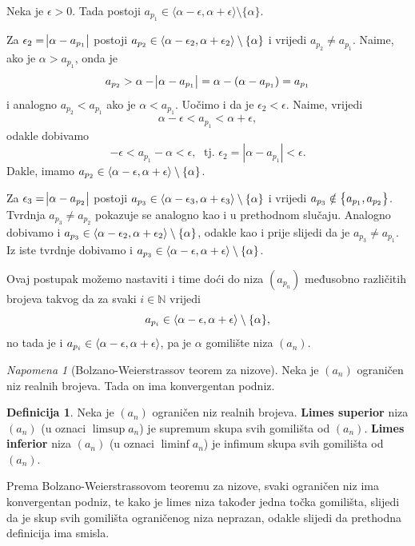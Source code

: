\documentclass{book}
\let\originalleft\left
\let\originalright\right
\renewcommand{\left}{\mathopen{}\mathclose\bgroup\originalleft}
\renewcommand{\right}{\aftergroup\egroup\originalright}
\renewenvironment{proof}{%
    \vspace{-\parskip}\begin{oldproof}%
    }{%
    \end{oldproof}%
}
\theoremstyle{definition}
\theoremstyle{definition}
\newtheorem{definition}{Definicija}
\theoremstyle{remark}
\newtheorem{remark}{Napomena}
\begin{document}
\begin{proof}[Rješenje]
Neka je $\epsilon>0$. Tada postoji $a_{p_1}\in \langle \alpha-\epsilon, \alpha+\epsilon\rangle\setminus \{\alpha\}$. 

Za $\epsilon_2=\abs{\alpha-a_{p_1}}$ postoji $a_{p_2}\in \left\langle \alpha-\epsilon_2, \alpha+\epsilon_2\right\rangle\setminus \{\alpha\}$ i vrijedi $a_{p_2}\neq a_{p_1}$. Naime, ako je $\alpha>a_{p_1}$, onda je $$a_{p_2}>\alpha-\abs{\alpha-a_{p_1}}=\alpha-(\alpha-a_{p_1})=a_{p_1}$$
i analogno $a_{p_2}<a_{p_1}$ ako je $\alpha< a_{p_1}$.
Uočimo i da je $\epsilon_2<\epsilon$. Naime, vrijedi
$$\alpha-\epsilon<a_{p_1}<\alpha+\epsilon,$$
odakle dobivamo
$$-\epsilon<a_{p_1}-\alpha<\epsilon,\;\text{ tj. } \epsilon_2=|\alpha-a_{p_1}|<\epsilon.$$
Dakle, imamo $a_{p_2}\in \left\langle \alpha-\epsilon, \alpha+\epsilon\right\rangle\setminus \{\alpha\}$.

Za $\epsilon_3=\abs{\alpha-a_{p_2}}$ postoji $a_{p_3}\in \left\langle \alpha-\epsilon_3, \alpha+\epsilon_3\right\rangle\setminus \{\alpha\}$ i vrijedi $a_{p_3}\notin \left\{a_{p_1},a_{p_2}\right\}$. Tvrdnja $a_{p_3}\neq a_{p_2}$ pokazuje se analogno kao i u prethodnom slučaju. Analogno dobivamo i $a_{p_3}\in \left\langle \alpha-\epsilon_2, \alpha+\epsilon_2\right\rangle\setminus \{\alpha\}$, odakle kao i prije slijedi da je $a_{p_3}\neq a_{p_1}$. Iz iste tvrdnje dobivamo i $a_{p_3}\in \left\langle \alpha-\epsilon, \alpha+\epsilon\right\rangle\setminus \{\alpha\}$.

Ovaj postupak možemo nastaviti i time doći do niza $(a_{p_n})$ međusobno različitih brojeva takvog da za svaki $i\in \mathbb{N}$ vrijedi 
$$a_{p_i}\in\left\langle \alpha-\epsilon, \alpha+\epsilon\right\rangle\setminus\{\alpha\},$$
no tada je i $a_{p_i}\in\left\langle \alpha-\epsilon, \alpha+\epsilon\right\rangle$, pa je $\alpha$ gomilište niza $(a_n)$.
\end{proof}  
\begin{remark}[Bolzano-Weierstrassov teorem za nizove]
Neka je $(a_n)$ ograničen niz realnih brojeva. Tada on ima konvergentan podniz.
\end{remark}
\begin{definition}
Neka je $(a_n)$ ograničen niz realnih brojeva. \textbf{Limes superior} niza $(a_n)$ (u oznaci $\limsup{a_n}$) je supremum skupa svih gomilišta od $(a_n)$. \textbf{Limes inferior} niza $(a_n)$ (u oznaci $\liminf{a_n}$) je infimum skupa svih gomilišta od $(a_n)$. 
\end{definition}

Prema Bolzano-Weierstrassovom teoremu za nizove, svaki ograničen niz ima konvergentan podniz, te kako je limes niza također jedna točka gomilišta, slijedi da je skup svih gomilišta ograničenog niza neprazan, odakle slijedi da prethodna definicija ima smisla.
\end{document}

